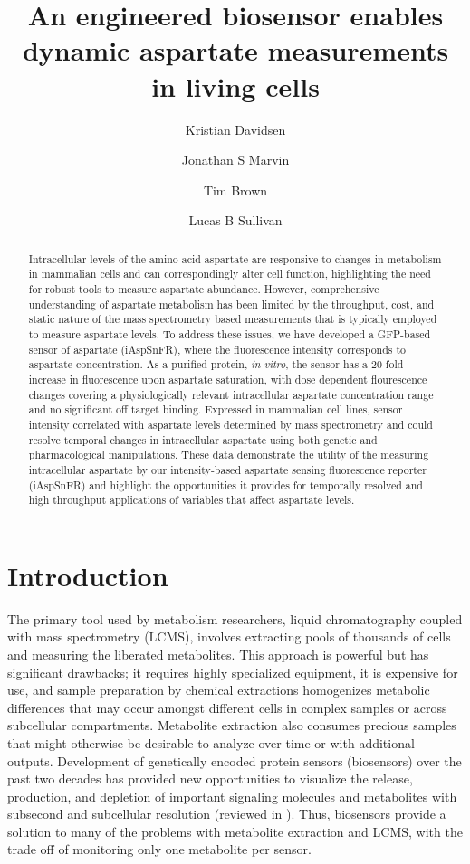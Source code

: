 \documentclass[9pt,lineno]{elife}
\title{An engineered biosensor enables dynamic aspartate measurements in living cells}
\author[1,2,\authfn{1}]{Kristian Davidsen}
\author[3,\authfn{1}*]{Jonathan S Marvin}
\author[3]{Tim Brown}
\author[1*]{Lucas B Sullivan}
\affil[1]{Human Biology Division, Fred Hutchinson Cancer Center, Seattle, WA, USA}
\affil[2]{Molecular and cellular biology program, University of Washington, Seattle, WA, USA}
\affil[3]{Howard Hughes Medical Institute (HHMI), Janelia Farm Research Campus, Ashburn, VA, USA}
\begin{document}
\maketitle

\begin{abstract}
Intracellular levels of the amino acid aspartate are responsive to changes in metabolism in mammalian cells and can correspondingly alter cell function, highlighting the need for robust tools to measure aspartate abundance.
However, comprehensive understanding of aspartate metabolism has been limited by the throughput, cost, and static nature of the mass spectrometry based measurements that is typically employed to measure aspartate levels.
To address these issues, we have developed a GFP-based sensor of aspartate (iAspSnFR), where the fluorescence intensity corresponds to aspartate concentration.
As a purified protein, \textit{in vitro}, the sensor has a 20-fold increase in fluorescence upon aspartate saturation, with dose dependent flourescence changes covering a physiologically relevant intracellular aspartate concentration range and no significant off target binding.
Expressed in mammalian cell lines, sensor intensity correlated with aspartate levels determined by mass spectrometry and could resolve temporal changes in intracellular aspartate using both genetic and pharmacological manipulations.
These data demonstrate the utility of the measuring intracellular aspartate by our intensity-based aspartate sensing fluorescence reporter (iAspSnFR) and highlight the opportunities it provides for temporally resolved and high throughput applications of variables that affect aspartate levels.
\end{abstract}


\section{Introduction}
The primary tool used by metabolism researchers, liquid chromatography coupled with mass spectrometry (LCMS), involves extracting pools of thousands of cells and measuring the liberated metabolites.
This approach is powerful but has significant drawbacks; it requires highly specialized equipment, it is expensive for use, and sample preparation by chemical extractions homogenizes metabolic differences that may occur amongst different cells in complex samples or across subcellular compartments.
Metabolite extraction also consumes precious samples that might otherwise be desirable to analyze over time or with additional outputs.
Development of genetically encoded protein sensors (biosensors) over the past two decades has provided new opportunities to visualize the release, production, and depletion of important signaling molecules and metabolites with subsecond and subcellular resolution (reviewed in \cite{Kostyuk2019-qc, Koveal2020-cl}).
Thus, biosensors provide a solution to many of the problems with metabolite extraction and LCMS, with the trade off of monitoring only one metabolite per sensor.
\end{document}
